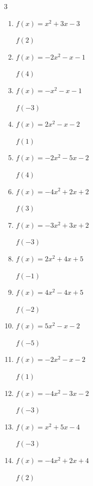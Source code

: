 \begin{multicols}{3}
\begin{enumerate}
  \item $f(x)=x^{2}+3x-3$

$f(2)$
        \phantom{$= 7$}

  \item $f(x)=-2x^{2}-x-1$

$f(4)$
        \phantom{$= -37$}

  \item $f(x)=-x^{2}-x-1$

$f(-3)$
        \phantom{$= -7$}

  \item $f(x)=2x^{2}-x-2$

$f(1)$
        \phantom{$= -1$}

  \item $f(x)=-2x^{2}-5x-2$

$f(4)$
        \phantom{$= -54$}

  \item $f(x)=-4x^{2}+2x+2$

$f(3)$
        \phantom{$= -28$}

\columnbreak %

  \item $f(x)=-3x^{2}+3x+2$

$f(-3)$
        \phantom{$= -34$}

  \item $f(x)=2x^{2}+4x+5$

$f(-1)$
        \phantom{$= 3$}

  \item $f(x)=4x^{2}-4x+5$

$f(-2)$
        \phantom{$= 29$}

  \item $f(x)=5x^{2}-x-2$

$f(-5)$
        \phantom{$= 128$}

  \item $f(x)=-2x^{2}-x-2$

$f(1)$
        \phantom{$= -5$}

  \item $f(x)=-4x^{2}-3x-2$

$f(-3)$
        \phantom{$= -29$}

  \item $f(x)=x^{2}+5x-4$

$f(-3)$
        \phantom{$= -10$}

  \item $f(x)=-4x^{2}+2x+4$

$f(2)$
        \phantom{$= -8$}


\end{enumerate}
\end{multicols}
